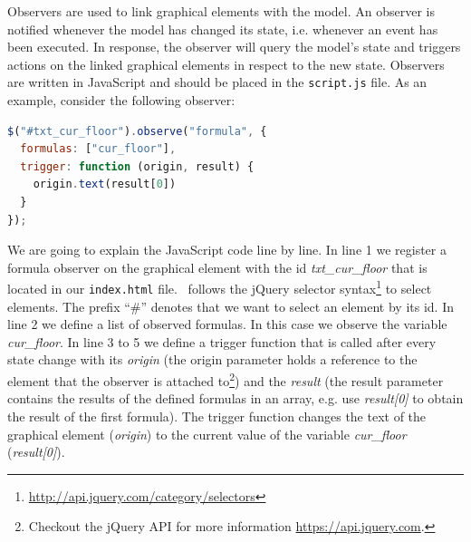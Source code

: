 Observers are used to link graphical elements with the model. 
An observer is notified whenever the model has changed its state, i.e. whenever an event has been executed. 
In response, the observer will query the model's state and triggers actions on the linked graphical elements in respect to the new state.
Observers are written in JavaScript and should be placed in the \texttt{script.js} file.
As an example, consider the following observer:

\begin{lstlisting}[language=JavaScript, caption={Formula Observer Displaying the Current Floor (JavaScript)}]
$("#txt_cur_floor").observe("formula", {
  formulas: ["cur_floor"],
  trigger: function (origin, result) {
    origin.text(result[0])
  }
});
\end{lstlisting}

We are going to explain the JavaScript code line by line.
In line 1 we register a formula observer on the graphical element with the id \textit{txt\_cur\_floor} that is located in our \texttt{index.html} file.
\bms~follows the jQuery selector syntax\footnote{\url{http://api.jquery.com/category/selectors}} to select elements.
The prefix ``\#'' denotes that we want to select an element by its id.
In line 2 we define a list of observed formulas.
In this case we observe the variable \textit{cur\_floor}.
In line 3 to 5 we define a trigger function that is called after every state change with its \textit{origin} (the origin parameter holds a reference to the element that the observer is attached to\footnote{Checkout the jQuery API for more information \url{https://api.jquery.com}.}) and the \textit{result} (the result parameter contains the results of the defined formulas in an array, e.g. use \textit{result[0]} to obtain the result of the first formula).
The trigger function changes the text of the graphical element (\textit{origin}) to the current value of the variable \textit{cur\_floor} (\textit{result[0]}).


